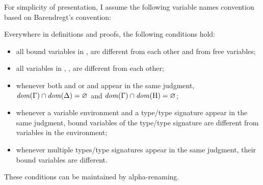 For simplicity of presentation, I assume the following variable names 
convention based on Barendregt's convention:

\begin{definition}\label{def:var-names}
    Everywhere in definitions and proofs, the following conditions hold:
    \begin{itemize}
        \item all bound variables in \ty, \tysig are different from each other 
            and from free variables;
        \item all variables in \AEnv, \UEnv, \UEnvD are different 
            from each other;
        \item whenever both \AEnv and \UEnv or \AEnv and \UEnvD
            appear in the same judgment, 
            $\operatorname{\mathit{dom}}(\Gamma) \cap \operatorname{\mathit{dom}}(\Delta) = \varnothing$ and
                $\operatorname{\mathit{dom}}(\Gamma) \cap \operatorname{\mathit{dom}}(\mathrm{H}) = \varnothing$;
        \item whenever a variable environment and a type/type signature
            appear in the same judgment, bound variables of the type/type
            signature are different from variables in the environment;
        \item whenever multiple types/type signatures appear in the same
            judgment, their bound variables are different.
    \end{itemize}
    These conditions can be maintained by alpha-renaming.
\end{definition}


